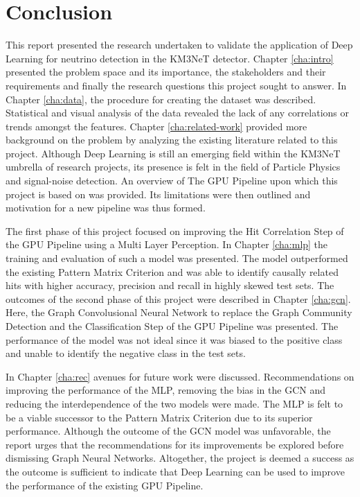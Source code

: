 
\chapter{Conclusion} %

% 

This report presented the research undertaken to validate the
application of Deep Learning for neutrino detection in the KM3NeT
detector. Chapter \ref{cha:intro} presented the problem space and its
importance, the stakeholders and their requirements and finally the
research questions this project sought to answer. In Chapter
\ref{cha:data}, the procedure for creating the dataset was described.
Statistical and visual analysis of the data revealed the lack of any
correlations or trends amongst the features. Chapter
\ref{cha:related-work} provided more background on the problem by
analyzing the existing literature related to this project. Although
Deep Learning is still an emerging field within the KM3NeT umbrella of
research projects, its presence is felt in the field of Particle
Physics and signal-noise detection. An overview of The GPU Pipeline
upon which this project is based on was provided. Its limitations
were then outlined and motivation for a new pipeline was thus formed.

The first phase of this project focused on improving the Hit
Correlation Step of the GPU Pipeline using a Multi Layer Perception.
In Chapter \ref{cha:mlp} the training and evaluation of such a model
was presented. The model outperformed the existing Pattern Matrix
Criterion and was able to identify causally related hits with higher
accuracy, precision and recall in highly skewed test sets. The
outcomes of the second phase of this project were described in Chapter
\ref{cha:gcn}. Here, the Graph Convolusional Neural Network to replace
the Graph Community Detection and the Classification Step of the GPU
Pipeline was presented. The performance of the model was not ideal
since it was biased to the positive class and unable to identify the
negative class in the test sets.

In Chapter \ref{cha:rec} avenues for future work were discussed.
Recommendations on improving the performance of the MLP, removing the
bias in the GCN and reducing the interdependence of the two models
were made. The MLP is felt to be a viable successor to the Pattern
Matrix Criterion due to its superior performance. Although the outcome
of the GCN model was unfavorable, the report urges that the
recommendations for its improvements be explored before dismissing
Graph Neural Networks. Altogether, the project is deemed a success as
the outcome is sufficient to indicate that Deep Learning can be used
to improve the performance of the existing GPU Pipeline.

